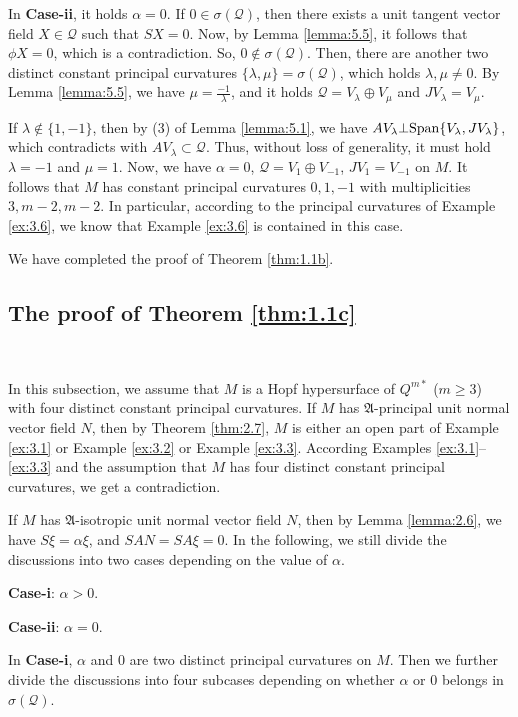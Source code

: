 \documentclass[reqno]{amsart}%
\theoremstyle{definition}
\numberwithin{equation}{section}
\begin{document}
In {\bf Case-ii}, it holds $\alpha=0$. If $0\in\sigma(\mathcal{Q})$, then there exists a unit tangent vector field $X\in\mathcal{Q}$ such that $SX=0$. Now, by Lemma \ref{lemma:5.5}, it follows that $\phi X=0$, which is a contradiction. So, $0\notin\sigma(\mathcal{Q})$.
Then, there are another two distinct constant principal curvatures $\{\lambda,\mu\}=\sigma(\mathcal{Q})$, which holds $\lambda,\mu\neq0$.
By Lemma \ref{lemma:5.5}, we have
$\mu=\tfrac{-1}{\lambda}$, and it holds $\mathcal{Q}=V_\lambda\oplus V_\mu$ and $JV_\lambda=V_\mu$.

If $\lambda\notin\{1,-1\}$, then by (3) of Lemma \ref{lemma:5.1}, we have
$AV_\lambda\bot{\rm Span}\{V_\lambda,JV_\lambda\}$, which contradicts with $AV_\lambda\subset\mathcal{Q}$. Thus, without loss of generality, it must hold $\lambda=-1$ and $\mu=1$.
Now, we have $\alpha=0$, $\mathcal{Q}=V_1\oplus V_{-1}$, $JV_1=V_{-1}$ on $M$. It follows that $M$ has constant principal curvatures $0,1,-1$ with multiplicities $3, m-2,m-2$.
In particular, according to the principal curvatures of
Example \ref{ex:3.6}, we know that Example \ref{ex:3.6} is contained in this case.

We have completed the proof of Theorem \ref{thm:1.1b}.



\subsection{The proof of Theorem \ref{thm:1.1c}}\label{sect:5.3}~

In this subsection, we assume that $M$ is a Hopf hypersurface of $Q^{m*}$ ($m\geq3$) with four distinct constant principal curvatures. 
If $M$ has $\mathfrak{A}$-principal unit normal vector field $N$, then by Theorem \ref{thm:2.7}, $M$ is either an open part of Example \ref{ex:3.1} or Example \ref{ex:3.2} or Example \ref{ex:3.3}. According Examples \ref{ex:3.1}--\ref{ex:3.3} and the assumption
that $M$ has four distinct constant principal curvatures, we get a contradiction.

If $M$ has $\mathfrak{A}$-isotropic unit normal vector field $N$, then by Lemma \ref{lemma:2.6}, we have $S\xi=\alpha\xi$, and $SAN=SA\xi=0$. In the following,
we still divide the discussions into two cases depending on the value of $\alpha$.

{\bf Case-i}: $\alpha>0$.

{\bf Case-ii}: $\alpha=0$.


In {\bf Case-i}, $\alpha$ and $0$ are two distinct principal curvatures on $M$.
Then we further divide the discussions into four subcases depending on whether $\alpha$ or $0$
belongs in $\sigma(\mathcal{Q})$.
\end{document}
